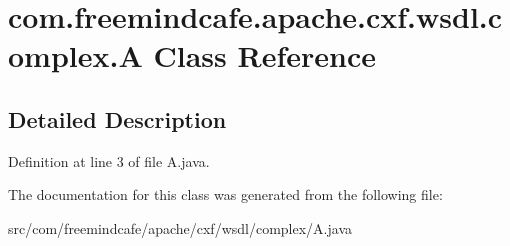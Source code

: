 \hypertarget{classcom_1_1freemindcafe_1_1apache_1_1cxf_1_1wsdl_1_1complex_1_1_a}{}\section{com.\+freemindcafe.\+apache.\+cxf.\+wsdl.\+complex.\+A Class Reference}
\label{classcom_1_1freemindcafe_1_1apache_1_1cxf_1_1wsdl_1_1complex_1_1_a}


\subsection{Detailed Description}


Definition at line 3 of file A.\+java.



The documentation for this class was generated from the following file\+:\begin{DoxyCompactItemize}
\item 
src/com/freemindcafe/apache/cxf/wsdl/complex/A.\+java\end{DoxyCompactItemize}
